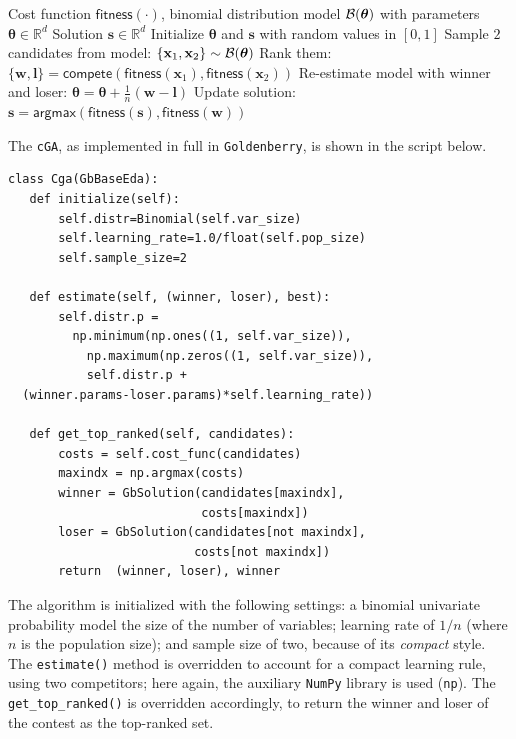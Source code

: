 \documentclass{sig-alternate}
\newcommand{\GB}{\texttt{Goldenberry}}
\newcommand{\cGA}{\texttt{cGA}}
\newcommand{\bs}{{\mathbf s}}
\newcommand{\bx}{{\mathbf x}}
\newcommand{\bw}{{\mathbf w}}
\newcommand{\bl}{{\mathbf l}}
\newcommand{\cB}{{\cal B}}
\newcommand{\Rdom}{\mbox{$\mathbb{R}$}}
\begin{document}
\begin{algorithm}[H]
	\caption{\cGA} 
	\small
	\begin{algorithmic}
	\REQUIRE Cost function $\mathsf{fitness}(\cdot)$, binomial distribution model $\cB(\boldsymbol \theta)$ with parameters $\boldsymbol \theta\in \Rdom^d$
	\ENSURE Solution $\bs \in \Rdom^d$
		\STATE Initialize $\boldsymbol \theta$ and $\bs$ with random values in $[0,1]$
		\WHILE{}
				\STATE Sample $2$ candidates from model: $\{\bx_1,\bx_2\} \sim \cB(\boldsymbol \theta)$
				\STATE Rank them: $ \{\bw, \bl\}=\mathsf{compete}(\mathsf{fitness}(\bx_1), \mathsf{fitness}(\bx_2))$ 
				\STATE Re-estimate model with winner and loser: $\boldsymbol \theta\!=\!\boldsymbol \theta+ \tfrac{1}{n}(\bw\!-\!\bl)$
				\STATE Update solution: $\bs = \mathsf{argmax}(\mathsf{fitness}(\bs),\mathsf{fitness}(\bw))$
			\ENDFOR
		\ENDWHILE
	\end{algorithmic}  
	\label{alg:cGA}
\end{algorithm}

The \cGA, as implemented in full in \GB, is shown in the script below. 

\begin{verbatim}
class Cga(GbBaseEda):
   def initialize(self):
       self.distr=Binomial(self.var_size)
       self.learning_rate=1.0/float(self.pop_size)
       self.sample_size=2
   
   def estimate(self, (winner, loser), best):
       self.distr.p = 
         np.minimum(np.ones((1, self.var_size)), 
           np.maximum(np.zeros((1, self.var_size)), 
           self.distr.p + 
  (winner.params-loser.params)*self.learning_rate))

   def get_top_ranked(self, candidates):
       costs = self.cost_func(candidates)
       maxindx = np.argmax(costs)
       winner = GbSolution(candidates[maxindx],  
                           costs[maxindx])
       loser = GbSolution(candidates[not maxindx], 
                          costs[not maxindx])
       return  (winner, loser), winner      
\end{verbatim}

The algorithm is initialized with the following settings: a binomial univariate probability model the size of the number of variables; learning rate of $1/n$ (where $n$ is the population size); and sample size of two, because of its  \emph{compact} style. The \texttt{estimate()} method is overridden to account for a compact learning rule, using two competitors; here again, the auxiliary  \texttt{NumPy} library is used (\texttt{np}). The \texttt{get\_top\_ranked()} is overridden accordingly, to return the winner and loser of the contest as the top-ranked set.
 
\end{document}
